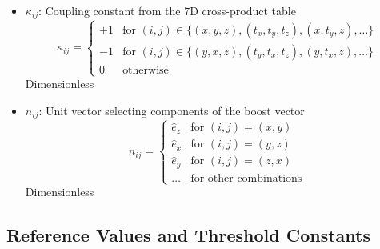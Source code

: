 \documentclass{article}
\begin{document}
\begin{itemize}
\item $\kappa_{ij}$: Coupling constant from the 7D cross-product table
    \begin{equation}
    \kappa_{ij} = \begin{cases}
    +1 & \text{for } (i,j) \in \{(x,y,z), (t_x,t_y,t_z), (x,t_y,z), \ldots\} \\
    -1 & \text{for } (i,j) \in \{(y,x,z), (t_y,t_x,t_z), (y,t_x,z), \ldots\} \\
    0 & \text{otherwise}
    \end{cases}
    \end{equation}
    Dimensionless
    
\item $\hat{n}_{ij}$: Unit vector selecting components of the boost vector
    \begin{equation}
    \hat{n}_{ij} = \begin{cases}
    \hat{e}_z & \text{for } (i,j) = (x,y) \\
    \hat{e}_x & \text{for } (i,j) = (y,z) \\
    \hat{e}_y & \text{for } (i,j) = (z,x) \\
    \ldots & \text{for other combinations}
    \end{cases}
    \end{equation}
    Dimensionless
\end{itemize}

\subsection{Reference Values and Threshold Constants}
\end{document}
